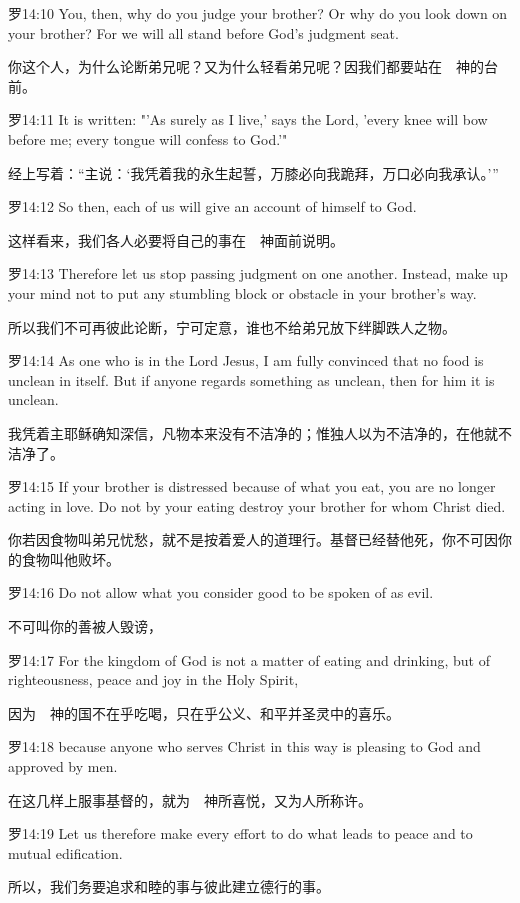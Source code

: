 \documentclass[a4paper,11pt,onecolumn,twoside]{ctexart}
\begin{document}
\begin{multicols}{2}
 罗14:10
 You, then, why do you judge your brother? Or why do you look down on your brother? For we will all stand before God's judgment seat.

 你这个人，为什么论断弟兄呢？又为什么轻看弟兄呢？因我们都要站在　神的台前。


 罗14:11
 It is written: "'As surely as I live,' says the Lord, 'every knee will bow before me; every tongue will confess to God.'"

 经上写着：“主说：‘我凭着我的永生起誓，万膝必向我跪拜，万口必向我承认。’”


 罗14:12
 So then, each of us will give an account of himself to God.

 这样看来，我们各人必要将自己的事在　神面前说明。


 罗14:13
 Therefore let us stop passing judgment on one another. Instead, make up your mind not to put any stumbling block or obstacle in your brother's way.

 所以我们不可再彼此论断，宁可定意，谁也不给弟兄放下绊脚跌人之物。


 罗14:14
 As one who is in the Lord Jesus, I am fully convinced that no food is unclean in itself. But if anyone regards something as unclean, then for him it is unclean.

 我凭着主耶稣确知深信，凡物本来没有不洁净的；惟独人以为不洁净的，在他就不洁净了。


 罗14:15
 If your brother is distressed because of what you eat, you are no longer acting in love. Do not by your eating destroy your brother for whom Christ died.

 你若因食物叫弟兄忧愁，就不是按着爱人的道理行。基督已经替他死，你不可因你的食物叫他败坏。


 罗14:16
 Do not allow what you consider good to be spoken of as evil.

 不可叫你的善被人毁谤，


 罗14:17
 For the kingdom of God is not a matter of eating and drinking, but of righteousness, peace and joy in the Holy Spirit,

 因为　神的国不在乎吃喝，只在乎公义、和平并圣灵中的喜乐。


 罗14:18
 because anyone who serves Christ in this way is pleasing to God and approved by men.

 在这几样上服事基督的，就为　神所喜悦，又为人所称许。


 罗14:19
 Let us therefore make every effort to do what leads to peace and to mutual edification.

 所以，我们务要追求和睦的事与彼此建立德行的事。



\end{multicols}
\end{document}

